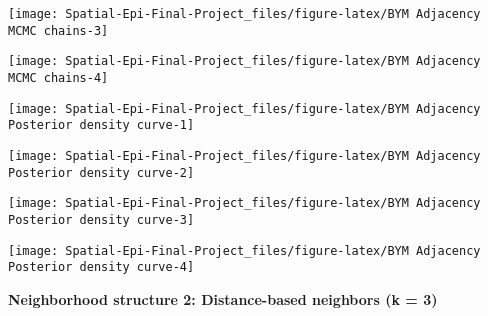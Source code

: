 \documentclass[]{article}
\begin{document}
\begin{center}\texttt{[image: Spatial-Epi-Final-Project\_files/figure-latex/BYM Adjacency MCMC chains-3]} \end{center}

\begin{center}\texttt{[image: Spatial-Epi-Final-Project\_files/figure-latex/BYM Adjacency MCMC chains-4]} \end{center}

\begin{center}\texttt{[image: Spatial-Epi-Final-Project\_files/figure-latex/BYM Adjacency Posterior density curve-1]} \end{center}

\begin{center}\texttt{[image: Spatial-Epi-Final-Project\_files/figure-latex/BYM Adjacency Posterior density curve-2]} \end{center}

\begin{center}\texttt{[image: Spatial-Epi-Final-Project\_files/figure-latex/BYM Adjacency Posterior density curve-3]} \end{center}

\begin{center}\texttt{[image: Spatial-Epi-Final-Project\_files/figure-latex/BYM Adjacency Posterior density curve-4]} \end{center}

\textbf{Neighborhood structure 2: Distance-based neighbors (k = 3)}
\end{document}
